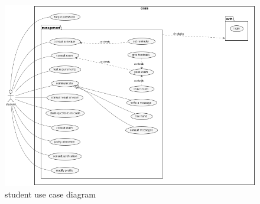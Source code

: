 \documentclass[a4paper,12p]{article}
\begin{document}
    \begin{figure}[h]
        \centering
        \includegraphics[width=350pt]{student_UCD}
        \caption{student use case diagram}
    \end{figure}
\end{document}

